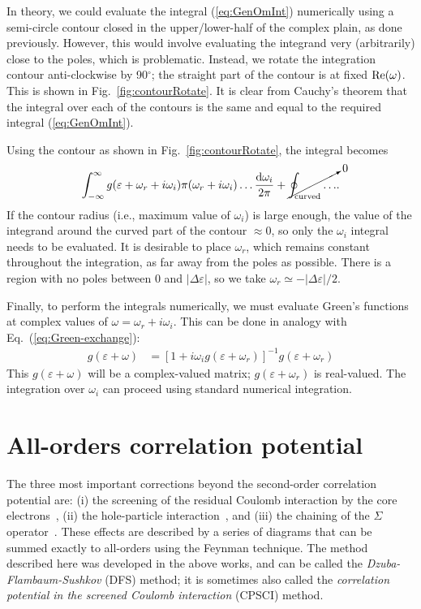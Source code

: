 \documentclass[10pt,twocolumn,a4paper]{article}%
\newcommand{\be}{\begin{equation}}
\newcommand{\ee}{\end{equation}}
\def\d{\ensuremath{{\rm d}}}
\def\en{\ensuremath{\varepsilon}}
\newcommand{\w}{\ensuremath{\omega}}
\begin{document}
In theory, we could evaluate the integral (\ref{eq:GenOmInt}) numerically using a semi-circle contour closed in the upper/lower-half of the complex plain, as done previously.
However, this would involve evaluating the integrand very (arbitrarily) close to the poles, which is problematic.
Instead, we rotate the integration contour anti-clockwise by 90$^\circ$; the straight part of the contour is at fixed ${\rm Re}(\w)$.
This is shown in Fig.~\ref{fig:contourRotate}.
It is clear from Cauchy's theorem that the integral over each of the contours is the same and equal to the required
integral (\ref{eq:GenOmInt}).


Using the contour as shown in Fig.~\ref{fig:contourRotate}, the integral becomes
\be\label{eq:GenOmInt-num}
\int_{-\infty}^\infty g(\en+\w_{r}+i\w_i)\pi(\w_{r}+i\w_i)\ldots \frac{\d\w_i}{2\pi} + \cancelto{0}{\oint_{\rm curved}\ldots}.
\ee
If the contour radius (i.e., maximum value of $\w_i$) is large enough, the value of the integrand around the curved part of the contour $\approx0$, so only the $\w_i$ integral needs to be evaluated.
It is desirable to place $\w_r$, which remains constant throughout the integration, as far away from the poles as possible.
There is a region with no poles between 0 and $|\Delta\en|$, so we take $\w_r \simeq -{|\Delta\en|}/2$.


Finally, to perform the integrals numerically, we must evaluate Green's functions at complex values of $\w=\w_r + i\w_i$.
This can be done in analogy with Eq.~(\ref{eq:Green-exchange}):
\begin{align}
g(\en+\w) &= \left[1+i\w_ig(\en+\w_r)\right]^{-1}g(\en+\w_r)
\end{align}
This $g(\en+\w)$ will be a complex-valued matrix; $g(\en+\w_r)$ is real-valued.
The integration over $\w_i$ can proceed using standard numerical integration.








\section{All-orders correlation potential}

The three most important corrections beyond the second-order correlation potential are:
(i) the screening of the residual Coulomb interaction by the core electrons~\cite{DzubaCPM1988pla},
(ii) the hole-particle interaction~\cite{DzubaCPM1989plaEn}, and
(iii) the chaining of the $\Sigma$ operator~\cite{DzubaPNC1985,DzubaPNC1984}.
These effects are described by a series of diagrams that can be summed exactly to all-orders using the Feynman technique.
The method described here was developed in the above works, and can be called the {\sl Dzuba-Flambaum-Sushkov} (DFS) method; it is sometimes also called the {\sl correlation potential in the screened Coulomb interaction} (CPSCI) method.
\end{document}
